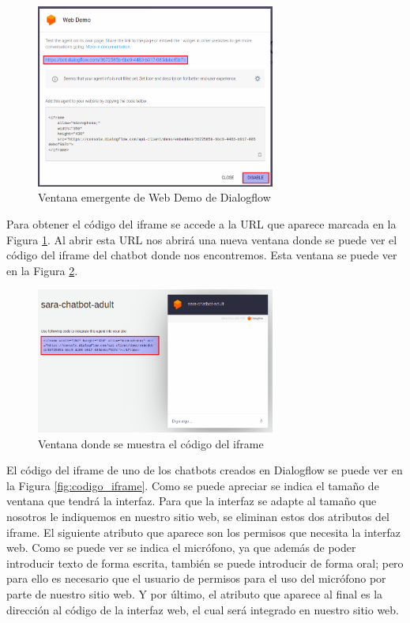 \begin{figure}[h]
\centering
\includegraphics[width=0.7\textwidth]{imagenes/07_Implementacion/web_demo.png}
\caption{Ventana emergente de Web Demo de Dialogflow}
\label{fig:web_demo}
\end{figure}

Para obtener el código del iframe se accede a la URL que aparece marcada en la Figura \ref{fig:web_demo}. Al abrir esta URL nos abrirá una nueva ventana donde se puede ver el código del iframe del chatbot donde nos encontremos. Esta ventana se puede ver en la Figura \ref{fig:dialogflow_iframe}.

\begin{figure}[h]
\centering
\includegraphics[width=0.7\textwidth]{imagenes/07_Implementacion/dialogflow_iframe.png}
\caption{Ventana donde se muestra el código del iframe}
\label{fig:dialogflow_iframe}
\end{figure}

El código del iframe de uno de los chatbots creados en Dialogflow se puede ver en la Figura \ref{fig:codigo_iframe}. Como se puede apreciar se indica el tamaño de ventana que tendrá la interfaz. Para que la interfaz se adapte al tamaño que nosotros le indiquemos en nuestro sitio web, se eliminan estos dos atributos del iframe. El siguiente atributo que aparece son los permisos que necesita la interfaz web. Como se puede ver se indica el micrófono, ya que además de poder introducir texto de forma escrita, también se puede introducir de forma oral; pero para ello es necesario que el usuario de permisos para el uso del micrófono por parte de nuestro sitio web. Y por último, el atributo que aparece al final es la dirección al código de la interfaz web, el cual será integrado en nuestro sitio web.

